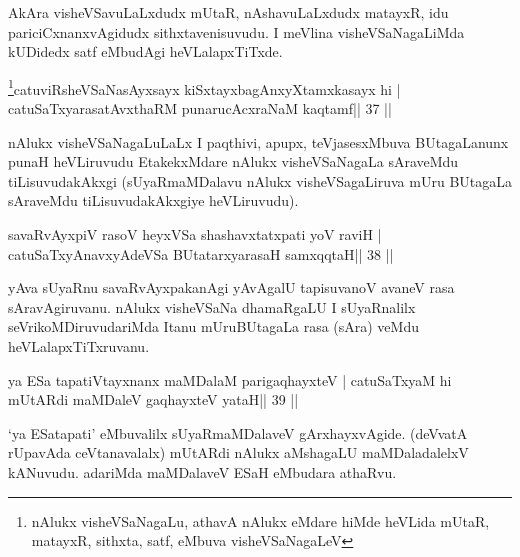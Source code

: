 \begin{artha}
AkAra visheVSavuLaLxdudx mUtaR, nAshavuLaLxdudx matayxR, idu
pariciCxnanxvAgidudx sithxtavenisuvudu. I meVlina visheVSaNagaLiMda
kUDidedx satf eMbudAgi heVLalapxTiTxde.
\end{artha}


\begin{shl}
\footnote{nAlukx visheVSaNagaLu, athavA nAlukx eMdare hiMde heVLida mUtaR, matayxR, sithxta, satf, eMbuva visheVSaNagaLeV}catuviRsheVSaNasAyxsayx kiSxtayxbagAnxyXtamxkasayx hi |
catuSaTxyarasatAvxthaRM punarucAcxraNaM kaqtamf\hfill || 37 ||
\end{shl}

\begin{artha}
nAlukx visheVSaNagaLuLaLx I paqthivi, apupx, teVjasesxMbuva BUtagaLanunx punaH heVLiruvudu EtakekxMdare nAlukx visheVSaNagaLa sAraveMdu tiLisuvudakAkxgi  (sUyaRmaMDalavu nAlukx visheVSagaLiruva mUru BUtagaLa sAraveMdu tiLisuvudakAkxgiye heVLiruvudu).
\end{artha}



\begin{shl}
savaRvAyxpiV rasoV heyxVSa shashavxtatxpati yoV raviH |
\footnotemark[1]catuSaTxyAnavxyAdeVSa BUtatarxyarasaH samxqqtaH\hfill || 38 ||
\end{shl}

\begin{artha}
yAva sUyaRnu savaRvAyxpakanAgi yAvAgalU tapisuvanoV avaneV rasa sAravAgiruvanu. nAlukx visheVSaNa dhamaRgaLU I sUyaRnalilx seVrikoMDiruvudariMda Itanu mUruBUtagaLa rasa (sAra) veMdu heVLalapxTiTxruvanu.
\end{artha}



\begin{shl}
ya ESa tapatiVtayxnanx maMDalaM parigaqhayxteV |
catuSaTxyaM hi mUtARdi maMDaleV gaqhayxteV yataH\hfill || 39 ||
\end{shl}

\begin{artha}
`ya ESatapati' eMbuvalilx sUyaRmaMDalaveV gArxhayxvAgide. (deVvatA rUpavAda ceVtanavalalx) mUtARdi nAlukx aMshagaLU maMDaladalelxV kANuvudu. adariMda maMDalaveV ESaH eMbudara athaRvu.
\end{artha}



